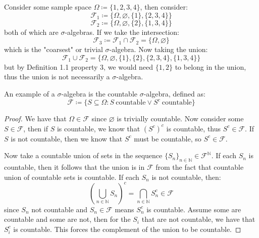 \documentclass[10pt,letterpaper]{article} %
\begin{document}
Consider some sample space $\Omega \coloneq \{1, 2, 3, 4\}$, then consider:
\begin{equation*}
\mathcal{F}_1 \coloneq \{\Omega, \varnothing, \{1\}, \{2, 3, 4\}\}
\end{equation*}
\begin{equation*}
\mathcal{F}_2 \coloneq \{\Omega, \varnothing, \{2\}, \{1, 3, 4\}\}
\end{equation*}
both of which are $\sigma$-algebras. If we take the intersection:
\begin{equation*}
\mathcal{F}_3 \coloneq \mathcal{F}_1 \cap \mathcal{F}_2 = \{\Omega, \varnothing\}
\end{equation*}
which is the "coarsest" or trivial $\sigma$-algebra. Now taking the union:
\begin{equation*}
\mathcal{F}_1 \cup \mathcal{F}_2 = \{\Omega, \varnothing, \{1\}, \{2\}, \{2, 3, 4\}, \{1, 3, 4\}\}
\end{equation*}
but by Definition 1.1 property $3$, we would need $\{1, 2\}$ to belong in the union, thus the union is not necessarily a $\sigma$-algebra.

An example of a $\sigma$-algebra is the countable $\sigma$-algebra, defined as:
\begin{equation*}
\mathcal{F} \coloneq \{S \subseteq \Omega: S \ \text{countable} \lor S^c \ \text{countable}\}
\end{equation*}
\begin{proof}
We have that $\Omega \in \mathcal{F}$ since $\varnothing$ is trivially countable. Now consider some $S \in \mathcal{F}$, then if $S$ is countable, we know that
$(S^c)^c$ is countable, thus $S^c \in \mathcal{F}$. If $S$ is not countable, then we know that $S^c$ must be countable, so $S^c \in \mathcal{F}$. 

Now take a countable union of sets in the sequence $\{S_n\}_{n \in \mathbb{N}} \in \mathcal{F}^\mathbb{N}$. If each $S_n$ is countable, then it follows that the union is in $\mathcal{F}$ from the fact
that countable union of countable sets is countable. If each $S_n$ is not countable, then:
\begin{equation*}
\left(\bigcup_{n \in \mathbb{N}}S_n\right)^c = \bigcap_{n \in \mathbb{N}}S_n^c \in \mathcal{F}
\end{equation*}
since $S_n$ not countable and $S_n \in \mathcal{F}$ means $S_n^c$ is countable. Assume some are countable and some are not, then for the $S_i$ that are not countable, we have that $S_i^c$ is countable. This forces the complement of the union to be countable.
\end{proof}
\end{document}
